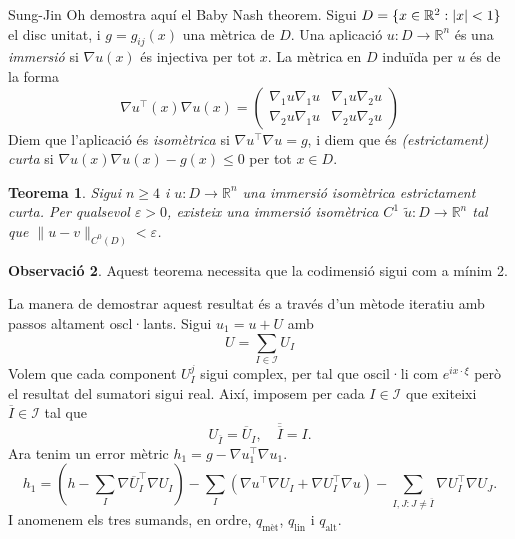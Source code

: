 \documentclass[11pt,a4paper,openright,oneside]{book}
\DeclarePairedDelimiter{\set}{\{}{\}}
\numberwithin{equation}{section}
\newtheorem{teo}{Teorema}[section]
\theoremstyle{definition}
\newtheorem{obs}[teo]{Observaci\'o}
\begin{document}
Sung-Jin Oh demostra aquí el Baby Nash theorem.
Sigui $D=\set{x\in\mathbb R^2 : |x|<1}$ el disc unitat, i $g = g_{ij}(x)$ una mètrica de $D$. Una aplicació $u:D\to\mathbb R^n$ és una \textit{immersió} si $\nabla u(x)$ és injectiva per tot $x$. La mètrica en $D$ induïda per $u$ és de la forma 
\begin{equation*}
    \nabla u ^{\intercal}(x)\nabla u (x) = \begin{pmatrix}
    \nabla_1 u\nabla_1 u & \nabla_1 u\nabla_2 u\\
    \nabla_2 u\nabla_1 u & \nabla_2 u\nabla_2 u
    \end{pmatrix}
\end{equation*}
Diem que l'aplicació és \textit{isomètrica} si $\nabla u ^{\intercal}\nabla u = g$, i diem que és \textit{(estrictament) curta} si $\nabla u(x) \nabla u(x) - g(x) \le 0$ per tot $x\in D$.
\begin{teo}
    Sigui $n\ge 4$ i $u:D\to\mathbb R^n$ una immersió isomètrica estrictament curta. Per qualsevol $\varepsilon > 0$, existeix una immersió isomètrica $C^1$ $\tilde u:D\to\mathbb R^n$ tal que $\|u-v\|_{C^0(D)} < \varepsilon$.
\end{teo}
\begin{obs}
    Aquest teorema necessita que la codimensió sigui com a mínim 2.
\end{obs}
La manera de demostrar aquest resultat és a través d'un mètode iteratiu amb passos altament oscl·lants.
Sigui $u_1 = u + U$ amb 
\begin{equation*}
    U=\sum_{I\in\mathcal I} U_I
\end{equation*}
Volem que cada component $U_I^j$ sigui complex, per tal que oscil·li com $e^{ix \cdot \xi}$ però el resultat del sumatori sigui real. Així, imposem per cada $I\in\mathcal I$ que exiteixi $\overline I\in\mathcal I$ tal que 
\begin{equation*}
    U_{\overline{I}} = \overline{U}_I, \quad \overline{\overline{I}} = I.
\end{equation*}
Ara tenim un error mètric $h_1 = g - \nabla u_1 ^{\intercal}\nabla u_1$.
\begin{equation*}
    h_1 = 
        \left( h-\sum_{I} \nabla \overline{U}_I ^{\intercal}\nabla U_I \right) 
        - \sum_{I}\left( \nabla u ^{\intercal}\nabla U_I + \nabla U_I ^{\intercal}\nabla u \right)
        - \sum_{I,J: J\not = \overline I} \nabla U_I ^{\intercal}\nabla U_J.
\end{equation*}
I anomenem els tres sumands, en ordre, $q_{\text{mèt}}$, $q_{\text{lin}}$ i $q_{\text{alt}}$.
\end{document}
